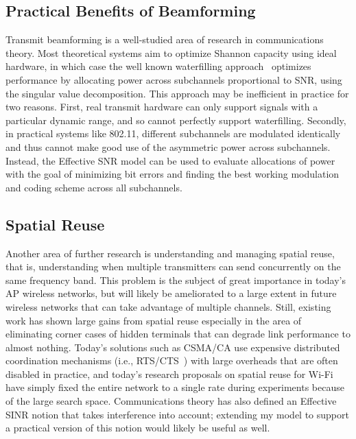\subsection{Practical Benefits of Beamforming}
Transmit beamforming is a well-studied area of research in communications theory. Most theoretical systems aim to optimize Shannon capacity using ideal hardware, in which case the well known waterfilling approach~\cite[p. 183]{Tse} optimizes performance by allocating power across subchannels proportional to SNR, using the singular value decomposition. This approach may be inefficient in practice for two reasons. First, real transmit hardware can only support signals with a particular dynamic range, and so cannot perfectly support waterfilling. Secondly, in practical systems like 802.11, different subchannels are modulated identically and thus cannot make good use of the asymmetric power across subchannels. Instead, the Effective SNR model can be used to evaluate allocations of power with the goal of minimizing bit errors and finding the best working modulation and coding scheme across all subchannels.

\subsection{Spatial Reuse}
Another area of further research is understanding and managing spatial reuse, that is, understanding when multiple transmitters can send concurrently on the same frequency band. This problem is the subject of great importance in today's AP wireless networks, but will likely be ameliorated to a large extent in future wireless networks that can take advantage of multiple channels. Still, existing work has shown large gains from spatial reuse especially in the area of eliminating corner cases of hidden terminals that can degrade link performance to almost nothing. Today's solutions such as CSMA/CA use expensive distributed coordination mechanisms (i.e., RTS/CTS~\cite{Karn_MACA}) with large overheads that are often disabled in practice, and today's research proposals on spatial reuse for Wi-Fi~\cite{Shrivastava_CENTAUR,Vutukuru_CMAP} have simply fixed the entire network to a single rate during experiments because of the large search space. Communications theory has also defined an Effective SINR notion that takes interference into account; extending my model to support a practical version of this notion would likely be useful as well.

